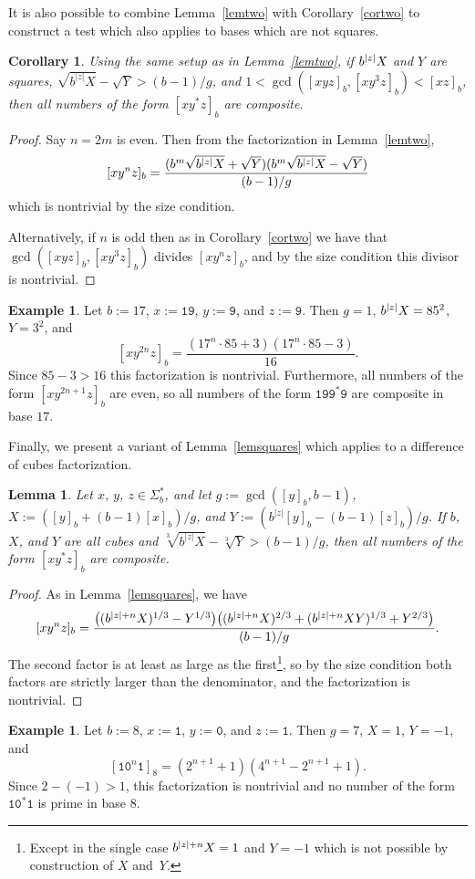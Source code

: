 \documentclass[12pt]{article}
\DeclarePairedDelimiter\abs{\lvert}{\rvert}
\theoremstyle{plain}
\newtheorem{corollary}[theorem]{Corollary}
\newtheorem{lemma}[theorem]{Lemma}
\theoremstyle{definition}
\newtheorem{example}[theorem]{Example}
\theoremstyle{remark}
\newcommand{\0}{\mathtt{0}}
\newcommand{\1}{\mathtt{1}}
\newcommand{\2}{\mathtt{2}}
\newcommand{\3}{\mathtt{3}}
\newcommand{\4}{\mathtt{4}}
\newcommand{\5}{\mathtt{5}}
\newcommand{\6}{\mathtt{6}}
\newcommand{\7}{\mathtt{7}}
\newcommand{\8}{\mathtt{8}}
\newcommand{\9}{\mathtt{9}}
\begin{document}
It is also possible to combine Lemma~\ref{lemtwo} with Corollary~\ref{cortwo} 
to construct a test which also applies to bases which are not squares.
\begin{corollary}
Using the same setup as in Lemma~\ref{lemtwo}, if\/ $b^{\abs{z}}X$ and $Y$ 
are squares, $\sqrt{b^{\lvert z\rvert}X}-\sqrt{Y}>(b-1)/g$, and
$1<\gcd([xyz]_b,[xy^3z]_b)<[xz]_b$, then all numbers of the form $[xy^*z]_b$ 
are composite.
\end{corollary}
\begin{proof}
Say $n=2m$ is even.  Then from the factorization in Lemma~\ref{lemtwo},
\[ [xy^nz]_b = \frac{(b^m\sqrt{b^{\abs{z}}X}+\sqrt{Y})(b^m\sqrt{b^{\abs{z}}X}-\sqrt{Y})}{(b-1)/g} \]
which is nontrivial by the size condition.

Alternatively, if $n$ is odd then as in Corollary~\ref{cortwo} we have that 
$\gcd([xyz]_b,[xy^3z]_b)$ divides $[xy^nz]_b$, and by the size condition this 
divisor is nontrivial.
\end{proof}
\begin{example}
Let $b:=17$, $x:=\1\9$, $y:=\9$, and $z:=\9$.  Then $g=1$, 
$b^{\abs{z}}X=85^2$, $Y=3^2$, and
\[ [xy^{2n}z]_b = \frac{(17^n\cdot85+3)(17^n\cdot85-3)}{16} . \]
Since $85-3>16$ this factorization is nontrivial.  Furthermore, all numbers 
of the form $[xy^{2n+1}z]_b$ are even, so all numbers of the form 
$\1\9\9^*\9$ are composite in base $17$.
\end{example}
Finally, we present a variant of Lemma~\ref{lemsquares} which applies to a 
difference of cubes factorization.
\begin{lemma}\label{lemcubes}
Let $x$, $y$, $z\in\Sigma^*_b$, and let $g:=\gcd([y]_b,b-1)$, 
$X:=([y]_b+(b-1)[x]_b)/g$, and $Y:=(b^{\lvert{z}\rvert}[y]_b-(b-1)[z]_b)/g$.
If\/ $b$, $X$, and $Y$ are all cubes and 
$\sqrt[3]{b^{\lvert z\rvert}X}-\sqrt[3]{Y}>(b-1)/g$, then all numbers of 
the form
 $[xy^*z]_b$ are composite.
\end{lemma}
\begin{proof}
As in Lemma~\ref{lemsquares}, we have
\[ [xy^nz]_b = \frac{\bigl((b^{\abs{z}+n}X)^{1/3}-Y^{1/3}\bigr)\bigl((b^{\abs{z}+n}X)^{2/3}+(b^{\abs{z}+n}XY)^{1/3}+Y^{2/3}\bigr)}{(b-1)/g} . \]
The second factor is at least as large as the first\footnote{Except in the 
single case $b^{\abs{z}+n}X=1$ and $Y=-1$ which is not possible by 
construction of $X$ and~$Y$.},
so by the size condition both factors are strictly larger than the 
denominator, and the factorization is nontrivial.
\end{proof}
\begin{example}
Let $b:=8$, $x:=\1$, $y:=\0$, and $z:=\1$.  Then $g=7$, $X=1$, $Y=-1$, and
\[ [\1\0^n\1]_8 = (2^{n+1}+1)(4^{n+1}-2^{n+1}+1) . \]
Since $2-(-1)>1$, this factorization is nontrivial and no number of the 
form $\1\0^*\1$ is prime in base $8$.
\end{example}
\end{document}
